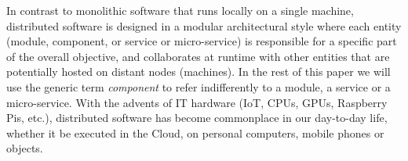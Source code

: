 %

In contrast to monolithic software that runs locally on a single machine, distributed software is designed in a modular architectural style where each entity (\ie module, component, or service or micro-service) is responsible for a specific part of the overall objective, and collaborates at runtime with other entities that are potentially hosted on distant nodes (\ie machines). In the rest of this paper we will use the generic term \emph{component} to refer indifferently to a module, a service or a micro-service. With the advents of IT hardware (IoT, CPUs, GPUs, Raspberry Pis, etc.), distributed software has become commonplace in our day-to-day life, whether it be executed in the Cloud, on personal computers, mobile phones or objects. 

